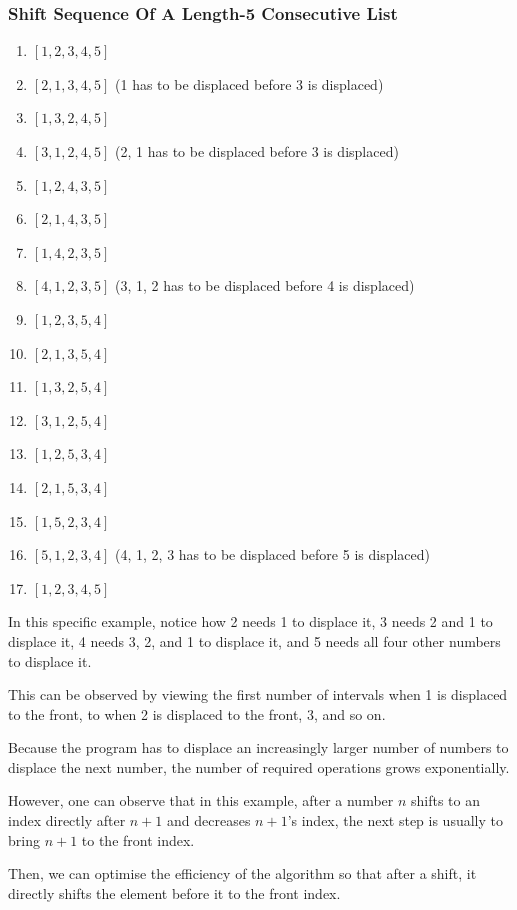 \documentclass[12pt]{article}
\begin{document}
\subsubsection{Shift Sequence Of A Length-5 Consecutive List}
\begin{enumerate}[start=0]
    \item $[1, 2, 3, 4, 5]$
    \item $[2, 1, 3, 4, 5]$ (1 has to be displaced before 3 is displaced)
    \item $[1, 3, 2, 4, 5]$
    \item $[3, 1, 2, 4, 5]$ (2, 1 has to be displaced before 3 is displaced)
    \item $[1, 2, 4, 3, 5]$
    \item $[2, 1, 4, 3, 5]$
    \item $[1, 4, 2, 3, 5]$
    \item $[4, 1, 2, 3, 5]$ (3, 1, 2 has to be displaced before 4 is displaced)
    \item $[1, 2, 3, 5, 4]$
    \item $[2, 1, 3, 5, 4]$
    \item $[1, 3, 2, 5, 4]$
    \item $[3, 1, 2, 5, 4]$
    \item $[1, 2, 5, 3, 4]$
    \item $[2, 1, 5, 3, 4]$
    \item $[1, 5, 2, 3, 4]$
    \item $[5, 1, 2, 3, 4]$ (4, 1, 2, 3 has to be displaced before 5 is displaced)
    \item $[1, 2, 3, 4, 5]$
\end{enumerate}

In this specific example, notice how 2 needs 1 to displace it, 3 needs 2 and 1 to displace it, 4 needs 3, 2, and 1 to displace it, and 5 needs all four other numbers to displace it.

This can be observed by viewing the first number of intervals when 1 is displaced to the front, to when 2 is displaced to the front, 3, and so on.

Because the program has to displace an increasingly larger number of numbers to displace the next number, the number of required operations grows exponentially.

However, one can observe that in this example, after a number $n$ shifts to an index directly after $n+1$ and decreases $n+1$'s index, the next step is usually to bring $n+1$ to the front index.

Then, we can optimise the efficiency of the algorithm so that after a shift, it directly shifts the element before it to the front index.
\end{document}
